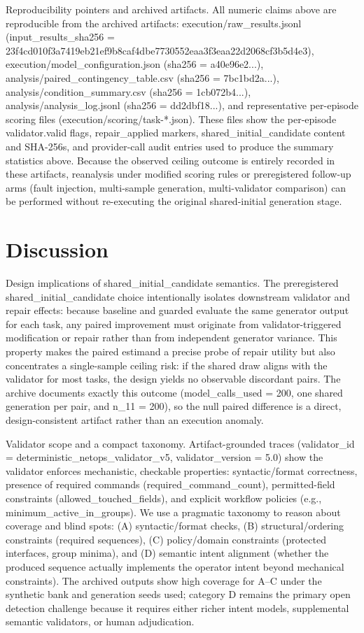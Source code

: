\documentclass[conference]{IEEEtran}
\begin{document}
Reproducibility pointers and archived artifacts. All numeric claims above are reproducible from the archived artifacts: execution/raw\_results.jsonl (input\_results\_sha256 = 23f4cd01\allowbreak{}0f3a7419\allowbreak{}eb21ef9b\allowbreak{}8caf4dbe\allowbreak{}7730552e\allowbreak{}aa3f3eaa\allowbreak{}22d2068c\allowbreak{}f3b5d4e3), execution/model\_configuration.json (sha256 = a40e96e2...), analysis/paired\_contingency\_table.csv (sha256 = 7bc1bd2a...), analysis/condition\_summary.csv (sha256 = 1cb072b4...), analysis/analysis\_log.jsonl (sha256 = dd2dbf18...), and representative per-episode scoring files (execution/scoring/task-*.json). These files show the per-episode validator.valid flags, repair\_applied markers, shared\_initial\_candidate content and SHA-256s, and provider-call audit entries used to produce the summary statistics above. Because the observed ceiling outcome is entirely recorded in these artifacts, reanalysis under modified scoring rules or preregistered follow-up arms (fault injection, multi-sample generation, multi-validator comparison) can be performed without re-executing the original shared-initial generation stage.

\section{Discussion}
Design implications of shared\_initial\_candidate semantics. The preregistered shared\_initial\_candidate choice intentionally isolates downstream validator and repair effects: because baseline and guarded evaluate the same generator output for each task, any paired improvement must originate from validator-triggered modification or repair rather than from independent generator variance. This property makes the paired estimand a precise probe of repair utility but also concentrates a single-sample ceiling risk: if the shared draw aligns with the validator for most tasks, the design yields no observable discordant pairs. The archive documents exactly this outcome (model\_calls\_used = 200, one shared generation per pair, and n\_11 = 200), so the null paired difference is a direct, design-consistent artifact rather than an execution anomaly.

Validator scope and a compact taxonomy. Artifact-grounded traces (validator\_id = deterministic\_netops\_validator\_v5, validator\_version = 5.0) show the validator enforces mechanistic, checkable properties: syntactic/format correctness, presence of required commands (required\_command\_count), permitted-field constraints (allowed\_touched\_fields), and explicit workflow policies (e.g., minimum\_active\_in\_groups). We use a pragmatic taxonomy to reason about coverage and blind spots: (A) syntactic/format checks, (B) structural/ordering constraints (required sequences), (C) policy/domain constraints (protected interfaces, group minima), and (D) semantic intent alignment (whether the produced sequence actually implements the operator intent beyond mechanical constraints). The archived outputs show high coverage for A--C under the synthetic bank and generation seeds used; category D remains the primary open detection challenge because it requires either richer intent models, supplemental semantic validators, or human adjudication.
\end{document}
